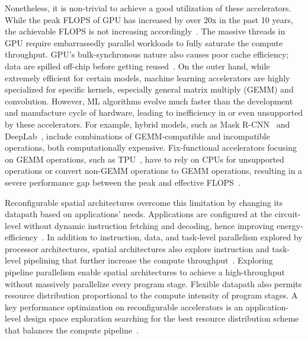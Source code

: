 Nonetheless, it is non-trivial to achieve a good utilization of these accelerators.
While the peak FLOPS of GPU has increased by over 20x in the past 10 years, the achievable FLOPS is
not increasing accordingly~\cite{floptrend, gpuperfana}.
The massive threads in GPU require embarrassedly parallel workloads to fully saturate the compute
throughput. GPU's bulk-synchronous nature also causes poor cache efficiency; data are spilled
off-chip before getting reused~\cite{gpuinefficiency}.
On the outer hand, 
while extremely efficient for certain models, machine learning accelerators are highly
specialized for specific kernels, especially general matrix multiply (GEMM) and convolution.
However, ML algorithms evolve much faster than the development and manufacture cycle of hardware, 
leading to inefficiency in or even unsupported by these accelerators.
For example, hybrid models, such as Mask R-CNN~\cite{maskrcnn} and DeepLab~\cite{deeplab}, include 
combinations of GEMM-compatible and incompatible operations, both computationally expensive.
Fix-functional accelerators focusing on GEMM operations, such as TPU~\cite{tpu}, 
have to rely on CPUs for unsupported operations or
convert non-GEMM operations to GEMM operations, resulting in a severe performance gap between the
peak and effective FLOPS~\cite{effflexdnnaccel}.

Reconfigurable spatial architectures overcome this limitation by changing its datapath based on applications' needs.
Applications are configured at the circuit-level without dynamic instruction fetching and decoding,
hence improving energy-efficiency~\cite{calhoun,fpgaPower}.
In addition to instruction, data, and task-level parallelism explored by processor architectures, spatial architectures also explore instruction and task-level
pipelining that further increase the compute throughput~\cite{spatial-computation}.
Exploring pipeline parallelism enable spatial architectures to achieve a high-throughput
without massively parallelize every program stage.
Flexible datapath also permits resource distribution proportional to the compute intensity of
program stages.
A key performance optimization on reconfigurable accelerators is an application-level design space
exploration 
searching for the best resource distribution scheme that balances the compute pipeline~\cite{dse_koeplinger}.

